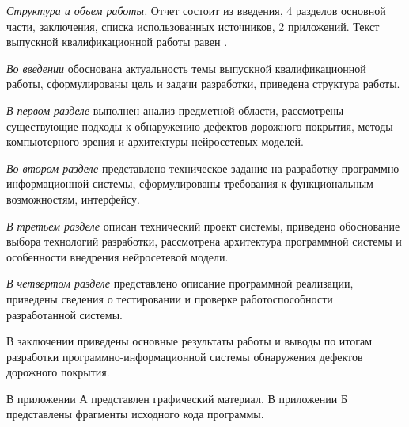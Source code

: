 \emph{Структура и объем работы.} Отчет состоит из введения, 4 разделов основной части, заключения, списка использованных источников, 2 приложений. Текст выпускной квалификационной работы равен .

\emph{Во введении} обоснована актуальность темы выпускной квалификационной работы, сформулированы цель и задачи разработки, приведена структура работы.

\emph{В первом разделе} выполнен анализ предметной области, рассмотрены существующие подходы к обнаружению дефектов дорожного покрытия, методы компьютерного зрения и архитектуры нейросетевых моделей.

\emph{Во втором разделе} представлено техническое задание на разработку программно-информационной системы, сформулированы требования к функциональным возможностям, интерфейсу.

\emph{В третьем разделе} описан технический проект системы, приведено обоснование выбора технологий разработки, рассмотрена архитектура программной системы и особенности внедрения нейросетевой модели.

\emph{В четвертом разделе} представлено описание программной реализации, приведены сведения о тестировании и проверке работоспособности разработанной системы.

В заключении приведены основные результаты работы и выводы по итогам разработки программно-информационной системы обнаружения дефектов дорожного покрытия.

В приложении А представлен графический материал.
В приложении Б представлены фрагменты исходного кода программы.


